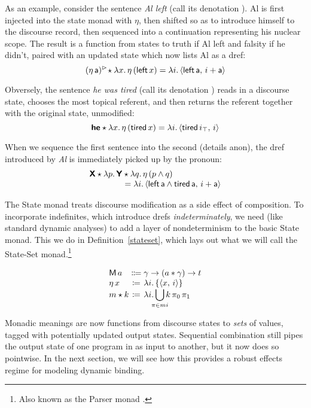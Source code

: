 As an example, consider the sentence \emph{Al left} (call its denotation ). Al is first injected into the state monad with $\eta$, then shifted so as to introduce himself to the discourse record, then sequenced into a continuation representing his nuclear scope. The result is a function from states to truth if Al left and falsity if he didn't, paired with an updated state which now lists Al as a dref:%
	\[(\eta\,\textsf{a})^\rhd\! \star \lambda x.\,\eta\,(\textsf{left}\,x) = \lambda i.\,\langle \textsf{left}\,\textsf{a},\,i+\textsf{a} \rangle\]%
	
\noindent
Obversely, the sentence \emph{he was tired} (call its denotation ) reads in a discourse state, chooses the most topical referent, and then returns the referent together with the original state, unmodified:%
	\[\textbf{\textsf{he}} \star \lambda x.\,\eta\,(\textsf{tired}\,x) = \lambda i.\,\langle \textsf{tired}\,i_\top,\,i \rangle\]%
	
\noindent
When we sequence the first sentence into the second (details anon), the dref introduced by \emph{Al} is immediately picked up by the pronoun: %
	\[\begin{array}{r@{}l}
		\bsf{X} \star \lambda p.\,\bsf{Y}&{}\star \lambda q.\,\eta\,(p \wedge q) %
		\\
		&{}= \lambda i.\,\ab{\textsf{left}\,\textsf{a} \wedge \textsf{tired}\,\textsf{a},\,i+\textsf{a}}%
	\end{array}\]
	
  The State monad treats discourse modification as a side effect of composition. To incorporate indefinites, which introduce drefs \emph{indeterminately}, we need (like standard dynamic analyses) to add a layer of nondeterminism to the basic State monad. This we do in Definition~\ref{stateset}, which lays out what we will call the State-Set monad.\footnote{Also known as the Parser monad \citep{HuttonMeijer}.}%
	\begin{defi}\label{stateset}
		\[\begin{array}[t]
			{@{}l@{}c@{}l@{}}
			\textsf{M}\,a &{}\Coloneqq{} &\gamma \ra (a \ast \gamma) \ra t%
			\\
			\eta\,x &{}\ceq{} &\lambda i.\,\{\ab{x,\,i}\}
			\\
			m \star k &{}\ceq{} &\lambda i.\displaystyle\bigcup_{\mathclap{\pi \in mi}}k\,\pi_0\,\pi_1%
		\end{array}\]
	\end{defi}

  Monadic meanings are now functions from discourse states to \emph{sets} of values, tagged with potentially updated output states. Sequential combination still pipes the output state of one program in as input to another, but it now does so pointwise. In the next section, we will see how this provides a robust effects regime for modeling dynamic binding. %

